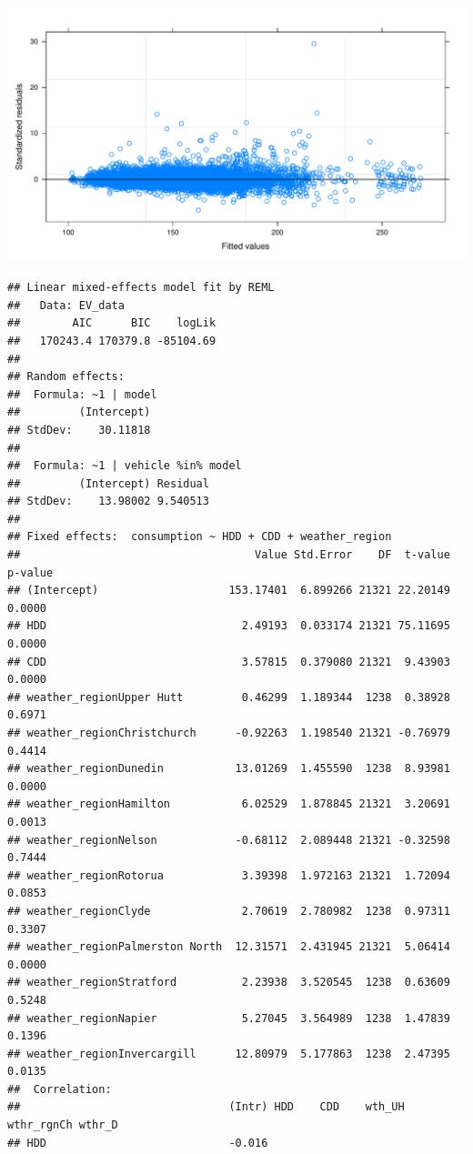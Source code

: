 \documentclass[
]{article}
\begin{document}
\includegraphics{mixed_model_files/figure-latex/unnamed-chunk-2-1.pdf}

\begin{verbatim}
## Linear mixed-effects model fit by REML
##   Data: EV_data 
##        AIC      BIC    logLik
##   170243.4 170379.8 -85104.69
## 
## Random effects:
##  Formula: ~1 | model
##         (Intercept)
## StdDev:    30.11818
## 
##  Formula: ~1 | vehicle %in% model
##         (Intercept) Residual
## StdDev:    13.98002 9.540513
## 
## Fixed effects:  consumption ~ HDD + CDD + weather_region 
##                                    Value Std.Error    DF  t-value p-value
## (Intercept)                    153.17401  6.899266 21321 22.20149  0.0000
## HDD                              2.49193  0.033174 21321 75.11695  0.0000
## CDD                              3.57815  0.379080 21321  9.43903  0.0000
## weather_regionUpper Hutt         0.46299  1.189344  1238  0.38928  0.6971
## weather_regionChristchurch      -0.92263  1.198540 21321 -0.76979  0.4414
## weather_regionDunedin           13.01269  1.455590  1238  8.93981  0.0000
## weather_regionHamilton           6.02529  1.878845 21321  3.20691  0.0013
## weather_regionNelson            -0.68112  2.089448 21321 -0.32598  0.7444
## weather_regionRotorua            3.39398  1.972163 21321  1.72094  0.0853
## weather_regionClyde              2.70619  2.780982  1238  0.97311  0.3307
## weather_regionPalmerston North  12.31571  2.431945 21321  5.06414  0.0000
## weather_regionStratford          2.23938  3.520545  1238  0.63609  0.5248
## weather_regionNapier             5.27045  3.564989  1238  1.47839  0.1396
## weather_regionInvercargill      12.80979  5.177863  1238  2.47395  0.0135
##  Correlation: 
##                                (Intr) HDD    CDD    wth_UH wthr_rgnCh wthr_D
## HDD                            -0.016                                       

\end{verbatim}
\end{document}
